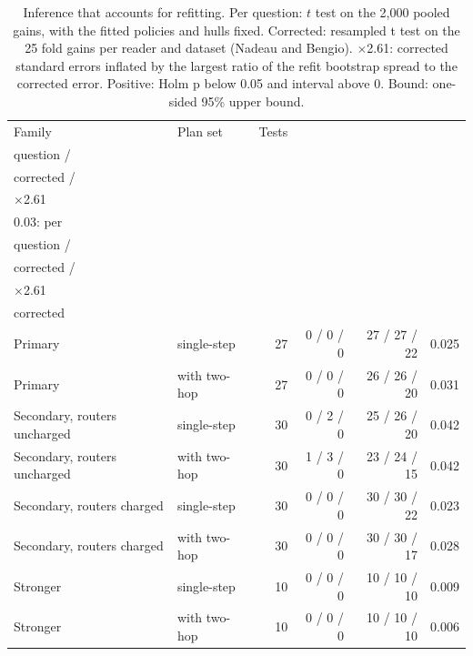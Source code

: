 \begin{table}[t]
\centering\small
\setlength{\tabcolsep}{4pt}
\caption{Inference that accounts for refitting. Per question: $t$ test on the 2,000 pooled gains, with the fitted policies and hulls fixed. Corrected: resampled t test on the 25 fold gains per reader and dataset (Nadeau and Bengio). $\times$2.61: corrected standard errors inflated by the largest ratio of the refit bootstrap spread to the corrected error. Positive: Holm p below 0.05 and interval above 0. Bound: one-sided 95\% upper bound.}
\label{tab:extra_inference}
\begin{tabular*}{\linewidth}{@{\extracolsep{\fill}}llrrrr}
\toprule
Family & Plan set & Tests & \begin{tabular}[b]{@{}r@{}}Positive: per \\ question / \\ corrected / \\ $\times$2.61\end{tabular} & \begin{tabular}[b]{@{}r@{}}Bound below \\ 0.03: per \\ question / \\ corrected / \\ $\times$2.61\end{tabular} & \begin{tabular}[b]{@{}r@{}}Largest bound, \\ corrected\end{tabular} \\
\midrule
Primary & single-step & 27 & 0 / 0 / 0 & 27 / 27 / 22 & 0.025 \\
Primary & with two-hop & 27 & 0 / 0 / 0 & 26 / 26 / 20 & 0.031 \\
Secondary, routers uncharged & single-step & 30 & 0 / 2 / 0 & 25 / 26 / 20 & 0.042 \\
Secondary, routers uncharged & with two-hop & 30 & 1 / 3 / 0 & 23 / 24 / 15 & 0.042 \\
Secondary, routers charged & single-step & 30 & 0 / 0 / 0 & 30 / 30 / 22 & 0.023 \\
Secondary, routers charged & with two-hop & 30 & 0 / 0 / 0 & 30 / 30 / 17 & 0.028 \\
Stronger & single-step & 10 & 0 / 0 / 0 & 10 / 10 / 10 & 0.009 \\
Stronger & with two-hop & 10 & 0 / 0 / 0 & 10 / 10 / 10 & 0.006 \\
\bottomrule
\end{tabular*}
\end{table}
